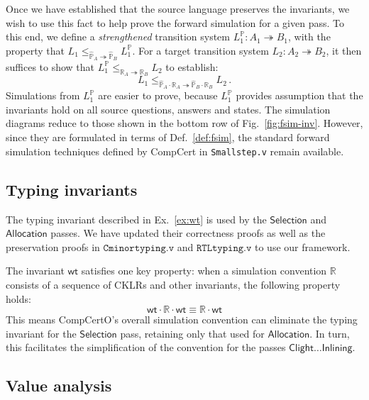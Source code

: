 \documentclass[acmsmall,screen,review,anonymous]{acmart}
\newcommand{\kw}[1]{\ensuremath{ \mathsf{#1} }}
\begin{document}
Once we have established that
the source language preserves the invariants,
we wish to use this fact to help prove the forward simulation
for a given pass.
To this end,
we define a \emph{strengthened} transition system
$L_1^\mathbb{P} : A_1 \twoheadrightarrow B_1$,
with the property that
$
   L_1 \le_{\hat{\mathbb{P}}_A \twoheadrightarrow \hat{\mathbb{P}}_B}
   L_1^\mathbb{P}
$.
For a target transition system $L_2 : A_2 \twoheadrightarrow B_2$,
it then suffices to show that
$
  L_1^\mathbb{P}
  \le_{\mathbb{R}_A \twoheadrightarrow \mathbb{R}_B}
  L_2
$
to establish:
\[
  L_1
  \le_{\hat{\mathbb{P}}_A \cdot \mathbb{R}_A \twoheadrightarrow
       \hat{\mathbb{P}}_B \cdot \mathbb{R}_B}
  L_2 \,.
\]
Simulations from $L_1^\mathbb{P}$
are easier to prove,
because $L_1^\mathbb{P}$
provides assumption that the invariants hold
on all source questions, answers and states.
The simulation diagrams
reduce to those shown in the bottom row of
Fig.~\ref{fig:fsim-inv}.
However, since they are formulated in terms of
Def.~\ref{def:fsim},
the standard forward simulation techniques
defined by CompCert
in \texttt{Smallstep.v}
remain available.


\subsection{Typing invariants} \label{sec:wt} %

The typing invariant described in Ex.~\ref{ex:wt}
is used by the $\kw{Selection}$ and $\kw{Allocation}$ passes.
We have updated their correctness proofs
as well as the preservation proofs in
$\texttt{Cminortyping.v}$ and $\texttt{RTLtyping.v}$
to use our framework.

The invariant $\kw{wt}$ satisfies one key property:
when a simulation convention $\mathbb{R}$
consists of a sequence of CKLRs and other invariants,
the following property holds:
\[
  \kw{wt} \cdot \mathbb{R} \cdot \kw{wt} \equiv
  \mathbb{R} \cdot \kw{wt}
\]
This means CompCertO's overall simulation convention
can eliminate the typing invariant for the $\kw{Selection}$ pass,
retaining only that used for $\kw{Allocation}$.
In turn, this facilitates the simplification of the convention for
the passes $\kw{Clight} \ldots \kw{Inlining}$.


\subsection{Value analysis} \label{sec:va} %
\end{document}
